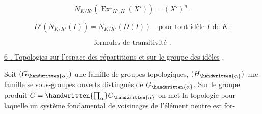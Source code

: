 \[ N_{K/K'}(\operatorname{Ext}_{K',K}(X'))=(X')^n\,.\tag*{(43)} \]

\[ D'(N_{K/K'}(I))=N_{K/K'}(D(I))\quad\text{pour tout idèle }I\text{ de }K\,.\tag*{(44)} \]

\[ \text{formules de transitivité .}\tag*{(45)} \]

\uline{6 . Topologies sur l'espace des répartitions et sur le groupe des idèles} .

Soit $(G_{\handwritten{\alpha}})$ une famille de groupes topologiques, $(H_{\handwritten{\alpha}})$ une famille se sous-groupes \uline{ouverts distingués} de $G_{\handwritten{\alpha}}$. Sur le groupe produit $G=\handwritten{\prod_{\alpha}}G_{\handwritten{\alpha}}$ on met la topologie pour laquelle un système fondamental de voisinages de l'élément neutre est for-
